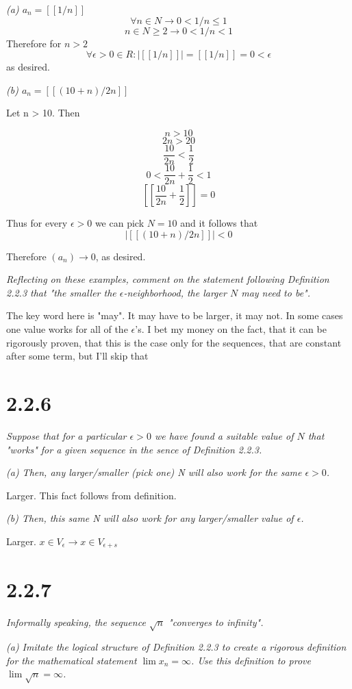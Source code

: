 \documentclass[11pt,oneside,titlepage]{article}
\begin{document}
\textit{(a) $a_n = [[1/n]]$}
$$\forall n \in N \to 0  < 1/n \leq 1$$
$$n \in N \geq 2 \to  0  < 1/n < 1$$
Therefore for $n > 2$
$$\forall \epsilon > 0 \in R: |[[1/n]]| = [[1/n]] = 0 < \epsilon$$
as desired.

\textit{(b) $a_n = [[(10 + n)/2n]]$}

Let n > 10. Then

$$n > 10$$
$$2n > 20$$
$$\frac{10}{2n} < \frac{1}{2}$$
$$0 < \frac{10}{2n} + \frac{1}{2} < 1$$
$$[[\frac{10}{2n} + \frac{1}{2} ]] = 0$$

Thus for every $\epsilon > 0$ we can pick $N = 10$ and it follows that 
$$|[[(10 + n)/2n]]| < 0$$

Therefore $(a_n) \to 0$, as desired.

\textit{Reflecting on these examples, comment on the statement following Definition
  2.2.3 that "the smaller the $\epsilon$-neighborhood, the larger $N$ may
  need to be".}

The key word here is "may". It may have to be larger, it may not. In some cases one
value works for all of the $\epsilon$'s. I bet my money on the fact, that it  can be rigorously proven, that this is the case only for the sequences, that are constant after
some term, but I'll skip that

\section*{2.2.6}
\textit{Suppose that for a particular $\epsilon > 0$ we have found a suitable
  value of $N$ that "works" for a given sequence in the sence of Definition 2.2.3.}

\textit{(a) Then, any larger/smaller (pick one) N will also work for the same $\epsilon > 0$.}

Larger. This fact follows from definition.

\textit{(b) Then, this same N will also work for any larger/smaller value of $\epsilon$.}

Larger. $x \in V_\epsilon \to x \in V_{\epsilon + s}$

\section*{2.2.7}
\textit{Informally speaking, the sequence $\sqrt{n}$ "converges to infinity".}

\textit{(a) Imitate the logical structure of Definition 2.2.3 to create a rigorous definition
  for the mathematical statement $\lim x_n = \infty$. Use this definition to prove
  $\lim \sqrt{n} = \infty$.}
\end{document}
